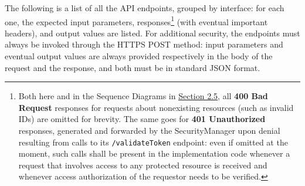 The following is a list of all the API endpoints, grouped by interface: for each one, the expected input parameters, responses\footnote{Both here and in the Sequence Diagrams in \hyperref[sec:runtime_view]{\protect\uline{Section 2.5}}, all \textbf{400 Bad Request} responses for requests about nonexisting resources (such as invalid IDs) are omitted for brevity. The same goes for \textbf{401 Unauthorized} responses, generated and forwarded by the SecurityManager upon denial resulting from calls to its \texttt{/validateToken} endpoint: even if omitted at the moment, such calls shall be present in the implementation code whenever a request that involves access to any protected resource is received and whenever access authorization of the requestor needs to be verified.} (with eventual important headers), and output values are listed. For additional security, the endpoints must always be invoked through the HTTPS POST method: input parameters and eventual output values are always provided respectively in the body of the request and the response, and both must be in standard JSON format.

